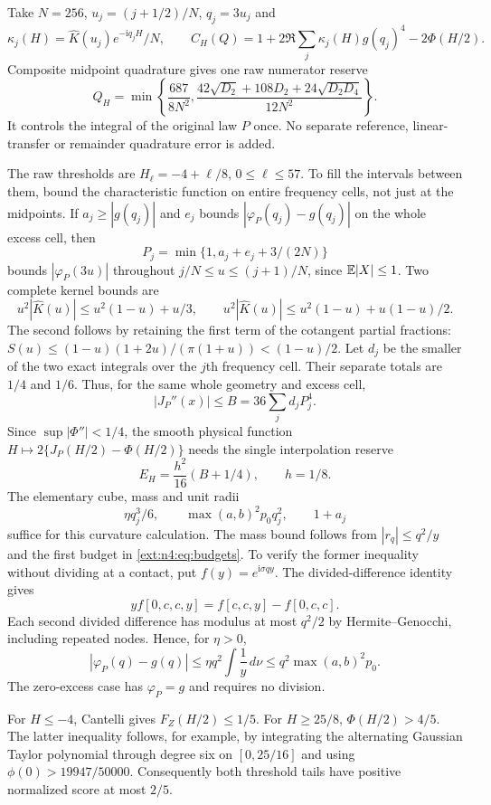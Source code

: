 Take $N=256$, $u_j=(j+1/2)/N$, $q_j=3u_j$ and
\[
 \kappa_j(H)=\widehat K(u_j)e^{-\mathrm i q_jH}/N,\qquad
 C_H(Q)=1+2\Re\sum_j\kappa_j(H)g(q_j)^4-2\Phi(H/2).
\]
Composite midpoint quadrature gives one raw numerator reserve
\begin{equation}\label{ext:n4:eq:midpoint}
 Q_H=\min\left\{\frac{687}{8N^2},
 \frac{42\sqrt{D_2}+108D_2+24\sqrt{D_2D_4}}{12N^2}\right\}.
\end{equation}
It controls the integral of the original law $P$ once. No separate
reference, linear-transfer or remainder quadrature error is added.

The raw thresholds are $H_\ell=-4+\ell/8$, $0\le\ell\le57$.
To fill the intervals between them, bound the characteristic function
on entire frequency cells, not just at the midpoints. If
$a_j\ge|g(q_j)|$ and $e_j$ bounds $|\varphi_P(q_j)-g(q_j)|$ on the
whole excess cell, then
\[
 P_j=\min\{1,a_j+e_j+3/(2N)\}
\]
bounds $|\varphi_P(3u)|$ throughout $j/N\le u\le(j+1)/N$,
since $\mathbb E|X|\le1$. Two complete kernel bounds are
\[
 u^2|\widehat K(u)|\le u^2(1-u)+u/3,\qquad
 u^2|\widehat K(u)|\le u^2(1-u)+u(1-u)/2.
\]
The second follows by retaining the first term of the cotangent
partial fractions:
$S(u)\le(1-u)(1+2u)/(\pi(1+u))<(1-u)/2$.
Let $d_j$ be the smaller of the two exact integrals over the $j$th
frequency cell. Their separate totals are $1/4$ and $1/6$.
Thus, for the same whole geometry and excess cell,
\[
 |J_P''(x)|\le B=36\sum_jd_jP_j^4.
\]
Since $\sup|\Phi''|<1/4$, the smooth physical function
$H\mapsto2\{J_P(H/2)-\Phi(H/2)\}$ needs the single interpolation
reserve
\begin{equation}\label{ext:n4:eq:H-reserve}
 E_H=\frac{h^2}{16}(B+1/4),\qquad h=1/8.
\end{equation}
The elementary cube, mass and unit radii
\[
 \eta q_j^3/6,\qquad \max(a,b)^2p_0q_j^2,\qquad 1+a_j
\]
suffice for this curvature calculation. The mass bound follows from
$|r_q|\le q^2/y$ and the first budget in
\eqref{ext:n4:eq:budgets}. To verify the former inequality without
dividing at a contact, put $f(y)=e^{\mathrm i\sigma qy}$. The
divided-difference identity gives
\[
 y f[0,c,c,y]=f[c,c,y]-f[0,c,c].
\]
Each second divided difference has modulus at most $q^2/2$ by
Hermite--Genocchi, including repeated nodes. Hence, for $\eta>0$,
\[
 |\varphi_P(q)-g(q)|
 \le\eta q^2\int\frac1y\,d\nu
 \le q^2\max(a,b)^2p_0.
\]
The zero-excess case has $\varphi_P=g$ and requires no division.

For $H\le-4$, Cantelli gives $F_Z(H/2)\le1/5$.
For $H\ge25/8$, $\Phi(H/2)>4/5$. The latter inequality follows,
for example, by integrating the alternating Gaussian Taylor
polynomial through degree six on $[0,25/16]$ and using
$\phi(0)>19947/50000$. Consequently both threshold tails have
positive normalized score at most $2/5$.

